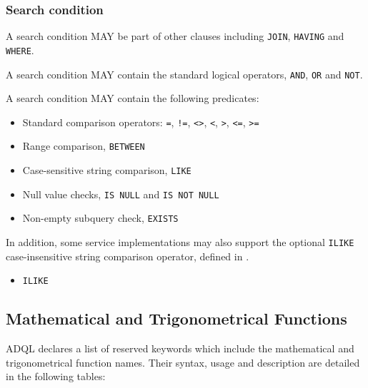 \documentclass[11pt,a4paper]{ivoa}
\begin{document}

\subsubsection{Search condition}
\label{sec:search}

A search condition MAY be part of other clauses including \verb:JOIN:, \verb:HAVING: and \verb:WHERE:.

A search condition MAY contain the standard logical operators, \verb:AND:, \verb:OR: and \verb:NOT:.

A search condition MAY contain the following predicates:

\begin{itemize}
    \item Standard comparison operators: \verb:=:, \verb:!=:, \verb:<>:, \verb:<:, \verb:>:, \verb:<=:, \verb:>=:
    \item Range comparison, \verb:BETWEEN:
    \item Case-sensitive string comparison, \verb:LIKE:
    \item Null value checks, \verb:IS NULL: and \verb:IS NOT NULL:
    \item Non-empty subquery check, \verb:EXISTS:
\end{itemize}

In addition, some service implementations may also support the optional \verb:ILIKE:
case-insensitive string comparison operator, defined in .

\begin{itemize}
    \item \verb:ILIKE:
\end{itemize}

\subsection{Mathematical and Trigonometrical Functions}
\label{sec:math.functions}

ADQL declares a list of reserved keywords  which include
the mathematical and trigonometrical function names. Their syntax,
usage and description are detailed in the following tables:
\end{document}
